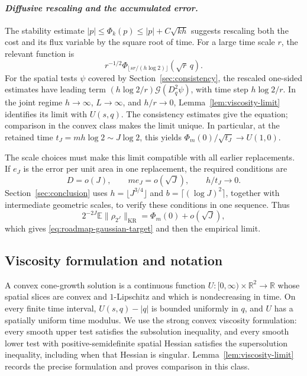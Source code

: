 \documentclass{smfart}
\theoremstyle{definition}
\newcommand{\1}{\mathbf 1}
\newcommand{\KR}{\mathrm{KR}}
\begin{document}
\smallskip
\paragraph{\textit{Diffusive rescaling and the accumulated error.}}
The stability estimate $|p|\leq\Phi_k(p)\leq|p|+C\sqrt{kh}$ suggests
rescaling both the cost and its flux variable by the square root of time.
For a large time scale $r$, the relevant function is
\[
r^{-1/2}\Phi_{\lfloor sr/(h\log2)\rfloor}(\sqrt r\,q).
\]
For the spatial tests $\psi$ covered by Section~\ref{sec:consistency},
the rescaled one-sided estimates have leading term
$(h\log2/r)\mathcal G(D_q^2\psi)$, with time step $h\log2/r$.
In the joint regime $h\to\infty$, $L\to\infty$, and $h/r\to0$,
Lemma~\ref{lem:viscosity-limit} identifies its limit with $U(s,q)$.
The consistency estimates give the equation; comparison in the convex
class makes the limit unique.  In particular, at the retained time
$t_J=mh\log2\sim J\log2$, this yields
$\Phi_m(0)/\sqrt{t_J}\to U(1,0)$.

The scale choices must make this limit compatible with all earlier
replacements.  If $e_J$ is the error per unit area in one replacement,
the required conditions are
\[
D=o(J),\qquad m e_J=o(\sqrt J),\qquad h/t_J\longrightarrow0.
\]
Section~\ref{sec:conclusion} uses $h=\lfloor J^{3/4}\rfloor$ and
$b=\lceil(\log J)^2\rceil$, together with intermediate geometric scales,
to verify these conditions in one sequence.  Thus
\[
2^{-2J}\mathbb E\|\rho_{2^J}\|_{\KR}
=\Phi_m(0)+o(\sqrt J),
\]
which gives \eqref{eq:roadmap-gaussian-target} and then the empirical
limit.

\subsection{Viscosity formulation and notation}\label{subsec:solution-class}

A convex cone-growth solution is a continuous function
\(U:[0,\infty)\times\mathbb R^2\to\mathbb R\) whose spatial slices are convex
and \(1\)-Lipschitz and which is nondecreasing in time.  On every finite time
interval, \(U(s,q)-|q|\) is bounded uniformly in \(q\), and \(U\) has a
spatially uniform time modulus.  We use the strong convex viscosity
formulation: every smooth upper test satisfies the subsolution inequality,
and every smooth lower test with positive-semidefinite spatial Hessian
satisfies the supersolution inequality, including when that Hessian is
singular.  Lemma~\ref{lem:viscosity-limit} records the precise formulation and
proves comparison in this class.
\end{document}
